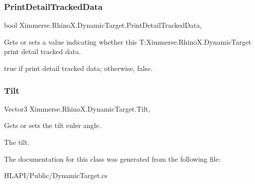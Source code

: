 \subsubsection{\texorpdfstring{Print\+Detail\+Tracked\+Data}{PrintDetailTrackedData}}
{\footnotesize\ttfamily bool Ximmerse.\+Rhino\+X.\+Dynamic\+Target.\+Print\+Detail\+Tracked\+Data\hspace{0.3cm}{\ttfamily [get]}, {\ttfamily [set]}}



Gets or sets a value indicating whether this T\+:\+Ximmerse.\+Rhino\+X.\+Dynamic\+Target print detail tracked data. 

{\ttfamily true} if print detail tracked data; otherwise, {\ttfamily false}.\mbox{\label{class_ximmerse_1_1_rhino_x_1_1_dynamic_target_a37e5698a43ecbe8551c95a4778498e1f}} 
\subsubsection{\texorpdfstring{Tilt}{Tilt}}
{\footnotesize\ttfamily Vector3 Ximmerse.\+Rhino\+X.\+Dynamic\+Target.\+Tilt\hspace{0.3cm}{\ttfamily [get]}, {\ttfamily [set]}}



Gets or sets the tilt euler angle. 

The tilt.

The documentation for this class was generated from the following file\+:\begin{DoxyCompactItemize}
\item 
H\+L\+A\+P\+I/\+Public/Dynamic\+Target.\+cs\end{DoxyCompactItemize}
